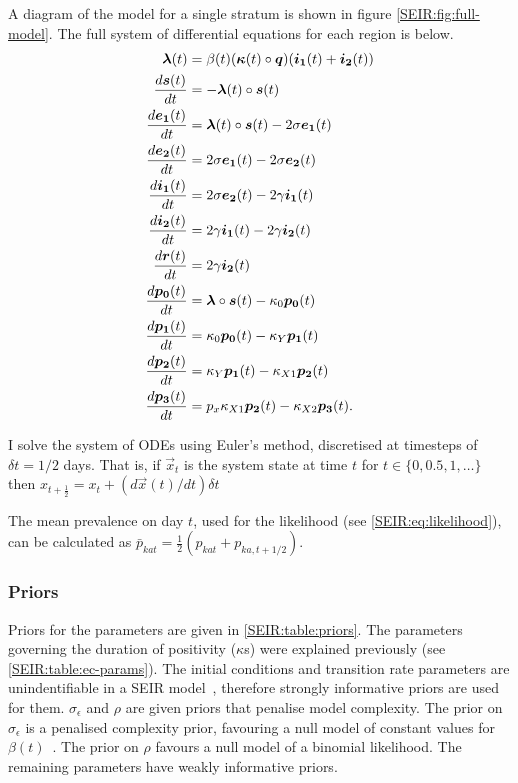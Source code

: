 \documentclass[thesis.tex]{subfiles}
\begin{document}
A diagram of the model for a single stratum is shown in figure \cref{SEIR:fig:full-model}.
The full system of differential equations for each region is below.
\begin{align}
    \label{SEIR:eq:fullODEs}
    \bm{\lambda}(t) &= \beta(t) (\bm{\kappa}(t) \circ \bm{q}) (\bm{i_1}(t) + \bm{i_2}(t)) \\
    \frac{d\bm{s}(t)}{dt} &= -\bm{\lambda}(t) \circ \bm{s}(t) \\
    \frac{d\bm{e_1}(t)}{dt} &= \bm{\lambda}(t) \circ \bm{s}(t) - 2\sigma \bm{e_1}(t) \\
    \frac{d\bm{e_2}(t)}{dt} &= 2\sigma \bm{e_1}(t) - 2\sigma \bm{e_2}(t) \\
    \frac{d\bm{i_1}(t)}{dt} &= 2\sigma \bm{e_2}(t) - 2\gamma \bm{i_1}(t) \\
    \frac{d\bm{i_2}(t)}{dt} &= 2\gamma \bm{i_1}(t) - 2\gamma \bm{i_2}(t) \\
    \frac{d\bm{r}(t)}{dt} &= 2\gamma \bm{i_2}(t) \\
    \frac{d\bm{p_0}(t)}{dt} &= \bm{\lambda} \circ \bm{s}(t) - \kappa_0 \bm{p_0}(t) \\
    \frac{d\bm{p_1}(t)}{dt} &= \kappa_0 \bm{p_0}(t) - \kappa_Y \bm{p_1}(t) \\
    \frac{d\bm{p_2}(t)}{dt} &= \kappa_Y \bm{p_1}(t) - \kappa_{X1} \bm{p_2}(t) \\
    \frac{d\bm{p_3}(t)}{dt} &= p_x \kappa_{X1} \bm{p_2}(t) - \kappa_{X2} \bm{p_3}(t).
\end{align}

I solve the system of ODEs using Euler's method, discretised at timesteps of $\delta t = 1/2$ days.
That is, if $\vec{x}_t$ is the system state at time $t$ for $t \in \{ 0, 0.5, 1, \dots \}$ then $x_{t+\frac{1}{2}} = x_t + (d\vec{x}(t)/dt) \delta t$

The mean prevalence on day $t$, used for the likelihood (see \cref{SEIR:eq:likelihood}), can be calculated as $\bar{p}_{kat} = \frac{1}{2} ( p_{kat} + p_{ka,t+1/2} )$.

\subsubsection{Priors} \label{SEIR:sec:priors}

Priors for the parameters are given in \cref{SEIR:table:priors}.
The parameters governing the duration of positivity ($\kappa$s) were explained previously (see \cref{SEIR:table:ec-params}).
The initial conditions and transition rate parameters are unindentifiable in a SEIR model~\autocite{dankwaStructural}, therefore strongly informative priors are used for them.
$\sigma_\epsilon$ and $\rho$ are given priors that penalise model complexity.
The prior on $\sigma_\epsilon$ is a penalised complexity prior, favouring a null model of constant values for $\beta(t)$~\autocite{simpsonPenalising}.
The prior on $\rho$ favours a null model of a binomial likelihood.
The remaining parameters have weakly informative priors.
\end{document}
